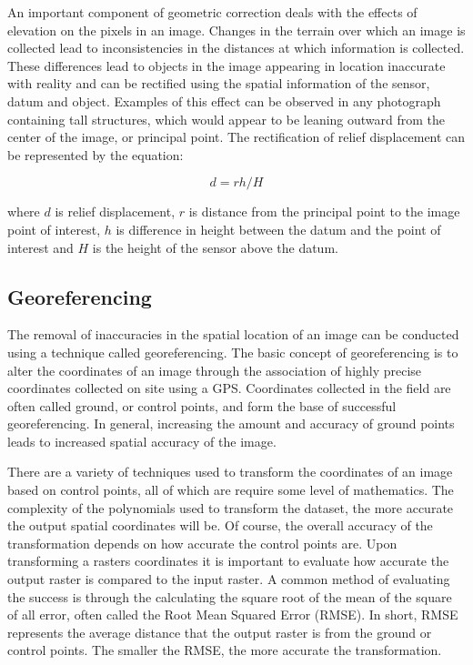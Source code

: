 \documentclass[
]{book}
\begin{document}
An important component of geometric correction deals with the effects of elevation on the pixels in an image. Changes in the terrain over which an image is collected lead to inconsistencies in the distances at which information is collected. These differences lead to objects in the image appearing in location inaccurate with reality and can be rectified using
the spatial information of the sensor, datum and object. Examples of this effect can be observed in any photograph containing tall structures, which would appear to be leaning outward from the center of the image, or principal point. The rectification of relief displacement can be represented by the equation:

\begin{equation}
d = rh/H
\label{eq:ortho}
\end{equation}

where \(d\) is relief displacement, \(r\) is distance from the principal point to the image point of interest, \(h\) is difference in height between the datum and the point of interest and \(H\) is the height of the sensor above the datum.

\subsection{Georeferencing}\label{georeferencing}

The removal of inaccuracies in the spatial location of an image can be conducted using a technique called georeferencing. The basic concept of georeferencing is to alter the coordinates of an image through the association of highly precise coordinates collected on site using a GPS. Coordinates collected in the field are often called ground, or control points, and form the base of successful georeferencing. In general, increasing the amount and accuracy of ground points leads to increased spatial accuracy of the image.

There are a variety of techniques used to transform the coordinates of an image based on control points, all of which are require some level of mathematics. The complexity of the polynomials used to transform the dataset, the more accurate the output spatial coordinates will be. Of course, the overall accuracy of the transformation depends on how accurate the control points are. Upon transforming a rasters coordinates it is important to evaluate how accurate the output raster is compared to the input raster. A common method of evaluating the success is through the calculating the square root of the mean of the square of all error, often called the Root Mean Squared Error (RMSE). In short, RMSE represents the average distance that the output raster is from the ground or control points. The smaller the RMSE, the more accurate the transformation.
\end{document}
